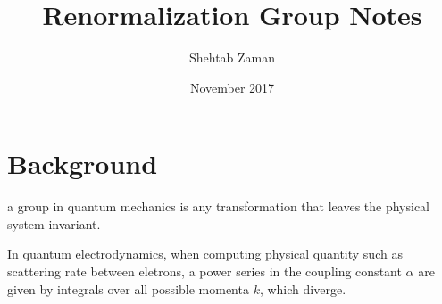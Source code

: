 \documentclass{article}
\title{Renormalization Group Notes}
\author{Shehtab Zaman }
\date{November 2017}
\begin{document}
\maketitle

\section{Background}

a group in quantum mechanics is any transformation
that leaves the physical system invariant.

In quantum electrodynamics, when computing physical quantity such
as scattering rate between eletrons, a power series in the coupling constant $\alpha $
are given by integrals over all possible momenta $ k$, which diverge. 
\end{document}
